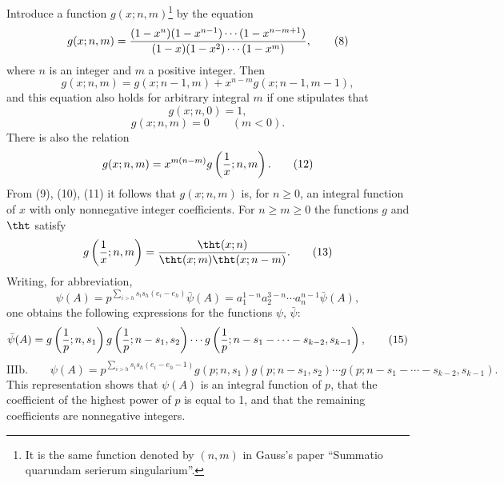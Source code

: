 Introduce a function $g(x;n,m)$\footnote{It is the same function denoted by $(n,m)$ in Gauss's paper ``Summatio quarundam serierum singularium''.} by the equation
\begin{equation}
 g(x;n,m)=
 { (1-x^n)(1-x^{n-1})\cdots(1-x^{n-m+1})
 \over
 (1-x)(1-x^2)\cdots(1-x^m) },
\tag{8}
\end{equation}
where $n$ is an integer and $m$ a positive integer. Then
\begin{equation}
 g(x;n,m)=g(x;n-1,m)+x^{n-m}g(x;n-1,m-1),
\tag{9}
\end{equation}
and this equation also holds for arbitrary integral $m$ if one stipulates that
\begin{equation}
 g(x;n,0)=1,
\tag{10}
\end{equation}
\begin{equation}
 g(x;n,m)=0\qquad (m<0).
\tag{11}
\end{equation}
There is also the relation
\begin{equation}
 g(x;n,m)=x^{m(n-m)}g\left({1\over x};n,m\right).
\tag{12}
\end{equation}
From (9), (10), (11) it follows that $g(x;n,m)$ is, for $n\ge0$, an integral function of $x$ with only nonnegative integer coefficients. For $n\ge m\ge0$ the functions $g$ and $\tht$ satisfy
\begin{equation}
 g\left({1\over x};n,m\right)={\tht(x;n)\over\tht(x;m)\tht(x;n-m)}.
\tag{13}
\end{equation}
Writing, for abbreviation,
\begin{equation}
 \psi(A)=p^{\sum_{i>h}s_i s_h(e_i-e_h)}\bar\psi(A)
 =a_1^{1-n}a_2^{3-n}\cdots a_n^{n-1}\bar\psi(A),
\tag{14}
\end{equation}
one obtains the following expressions for the functions $\psi$, $\bar\psi$:
\begin{equation}
 \bar\psi(A)=
 g\left({1\over p};n,s_1\right)
 g\left({1\over p};n-s_1,s_2\right)
 \cdots
 g\left({1\over p};n-s_1-\cdots-s_{k-2},s_{k-1}\right),
\tag{15}
\end{equation}
\begin{equation}
\text{IIIb.}\qquad
 \psi(A)=p^{\sum_{i>h}s_i s_h(e_i-e_h-1)}
 g(p;n,s_1)g(p;n-s_1,s_2)\cdots
 g(p;n-s_1-\cdots-s_{k-2},s_{k-1}).
\tag{16}
\end{equation}
This representation shows that $\psi(A)$ is an integral function of $p$, that the coefficient of the highest power of $p$ is equal to 1, and that the remaining coefficients are nonnegative integers.

